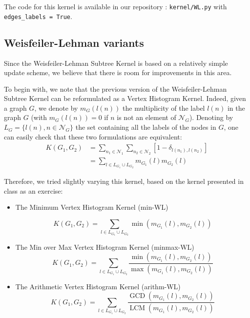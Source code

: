 \documentclass{IEEEtran}
\begin{document}
The code for this kernel is available in our repository : \texttt{kernel/WL.py}
with \texttt{edges\_labels = True}.

\subsection{Weisfeiler-Lehman variants}
Since the Weisfeiler-Lehman Subtree Kernel is based on a relatively simple update scheme,
we believe that there is room for improvements in this area.

To begin with, we note that the previous version of the Weisfeiler-Lehman Subtree Kernel can be reformulated
as a Vertex Histogram Kernel. Indeed,
given a graph $G$, we denote by $m_G(l(n))$ the multiplicity of
the label $l(n)$ in the graph $G$ (with $m_G(l(n)) = 0$ if $n$ is not an
element of $\mathcal N_G$). Denoting by $L_G = \{l(n), n \in \mathcal N_G\}$
the set containing all the labels of the nodes in $G$,
one can easily check that these two formulations are equivalent:
\begin{equation*}
    \begin{split}
        K(G_1, G_2) & = \sum_{n_1 \in \mathcal{N}_1} \sum_{n_2 \in \mathcal{N}_2} [1 - \delta_{l(n_1), l(n_2)}]\\
        &= \sum_{l \in L_{G_1} \cup L_{G_2}} m_{G_1}(l)m_{G_2}(l)
    \end{split}
\end{equation*}

Therefore, we tried slightly varying this kernel, based on the kernel presented in class as an exercise:

\begin{itemize}
    \item The Minimum Vertex Histogram Kernel (min-WL)

          \begin{equation*}
              K(G_1, G_2) = \sum_{l \in L_{G_1} \cup L_{G_2}} \operatorname*{min}(m_{G_1}(l), m_{G_2}(l))
          \end{equation*}

    \item The Min over Max Vertex Histogram Kernel (minmax-WL)
          \begin{equation*}
              K(G_1, G_2) = \sum_{l \in L_{G_1} \cup L_{G_2}} \frac{\operatorname*{min}(m_{G_1}(l), m_{G_2}(l))}{\operatorname*{max}(m_{G_1}(l), m_{G_2}(l))}
          \end{equation*}
    \item The Arithmetic Vertex Histogram Kernel (arithm-WL)
          \begin{equation*}
              K(G_1, G_2) = \sum_{l \in L_{G_1} \cup L_{G_2}} \frac{\operatorname*{GCD}(m_{G_1}(l), m_{G_2}(l))}{\operatorname*{LCM}(m_{G_1}(l), m_{G_2}(l))}
          \end{equation*}
\end{itemize}
\end{document}
